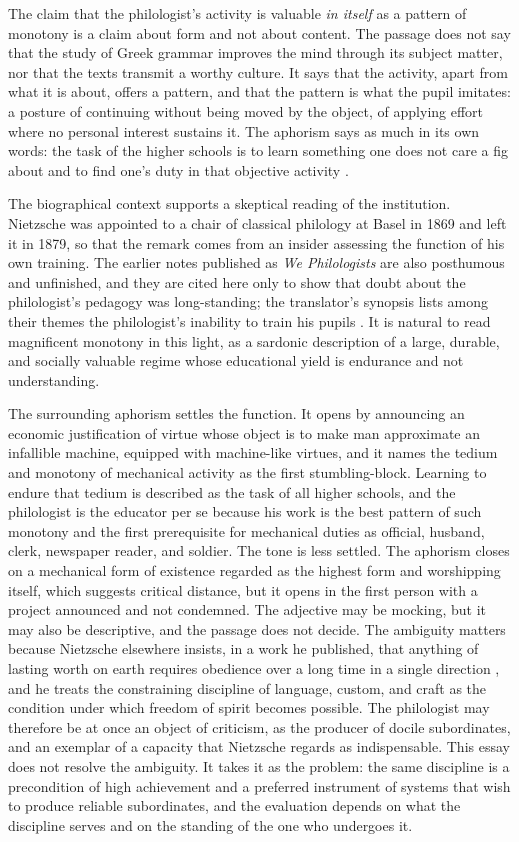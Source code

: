 \documentclass[11pt]{article}
\begin{document}
The claim that the philologist's activity is valuable \emph{in itself} as a pattern of monotony is a claim about form and not about content. The passage does not say that the study of Greek grammar improves the mind through its subject matter, nor that the texts transmit a worthy culture. It says that the activity, apart from what it is about, offers a pattern, and that the pattern is what the pupil imitates: a posture of continuing without being moved by the object, of applying effort where no personal interest sustains it. The aphorism says as much in its own words: the task of the higher schools is to learn something one does not care a fig about and to find one's duty in that objective activity \cite[Aph.\ 888]{wtp2}.

The biographical context supports a skeptical reading of the institution. Nietzsche was appointed to a chair of classical philology at Basel in 1869 and left it in 1879, so that the remark comes from an insider assessing the function of his own training. The earlier notes published as \emph{We Philologists} are also posthumous and unfinished, and they are cited here only to show that doubt about the philologist's pedagogy was long-standing; the translator's synopsis lists among their themes the philologist's inability to train his pupils \cite{wp}. It is natural to read magnificent monotony in this light, as a sardonic description of a large, durable, and socially valuable regime whose educational yield is endurance and not understanding.

The surrounding aphorism settles the function. It opens by announcing an economic justification of virtue whose object is to make man approximate an infallible machine, equipped with machine-like virtues, and it names the tedium and monotony of mechanical activity as the first stumbling-block. Learning to endure that tedium is described as the task of all higher schools, and the philologist is the educator per se because his work is the best pattern of such monotony and the first prerequisite for mechanical duties as official, husband, clerk, newspaper reader, and soldier. The tone is less settled. The aphorism closes on a mechanical form of existence regarded as the highest form and worshipping itself, which suggests critical distance, but it opens in the first person with a project announced and not condemned. The adjective may be mocking, but it may also be descriptive, and the passage does not decide. The ambiguity matters because Nietzsche elsewhere insists, in a work he published, that anything of lasting worth on earth requires obedience over a long time in a single direction \cite[Sec.\ 188]{bge}, and he treats the constraining discipline of language, custom, and craft as the condition under which freedom of spirit becomes possible. The philologist may therefore be at once an object of criticism, as the producer of docile subordinates, and an exemplar of a capacity that Nietzsche regards as indispensable. This essay does not resolve the ambiguity. It takes it as the problem: the same discipline is a precondition of high achievement and a preferred instrument of systems that wish to produce reliable subordinates, and the evaluation depends on what the discipline serves and on the standing of the one who undergoes it.
\end{document}
